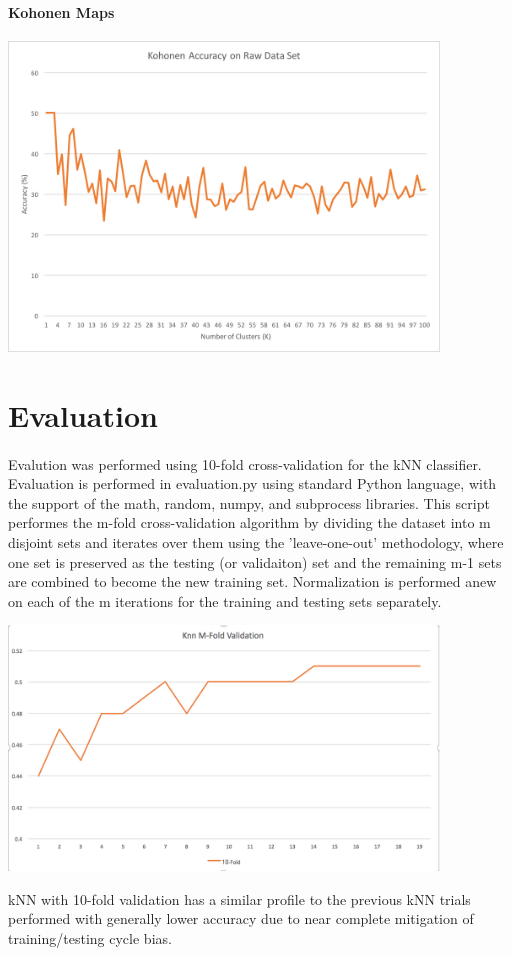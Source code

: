\documentclass{article}
\begin{document}
\paragraph{Kohonen Maps}
\centerline{\includegraphics[width = 4.5in]{images/KohonenAccuracyRaw}}
\newpage


\section*{Evaluation}
\paragraph{}
Evalution was performed using 10-fold cross-validation for the kNN classifier.
Evaluation is performed in evaluation.py using standard Python language, with the support of
the math, random, numpy, and subprocess libraries.  This script performes the m-fold
cross-validation algorithm by dividing the dataset into m disjoint sets and iterates over them
using the 'leave-one-out' methodology, where one set is preserved as the testing (or validaiton)
set and the remaining m-1 sets are combined to become the new training set.  Normalization is
performed anew on each of the m iterations for the training and testing sets separately.
\newline
\newline
\centerline{\includegraphics[width = 4.5in]{images/KNN_MFOLD2.png}}
\newline
\newline
kNN with 10-fold validation has a similar profile to the previous kNN trials performed with
generally lower accuracy due to near complete mitigation of training/testing cycle bias.
\newpage
\end{document}
